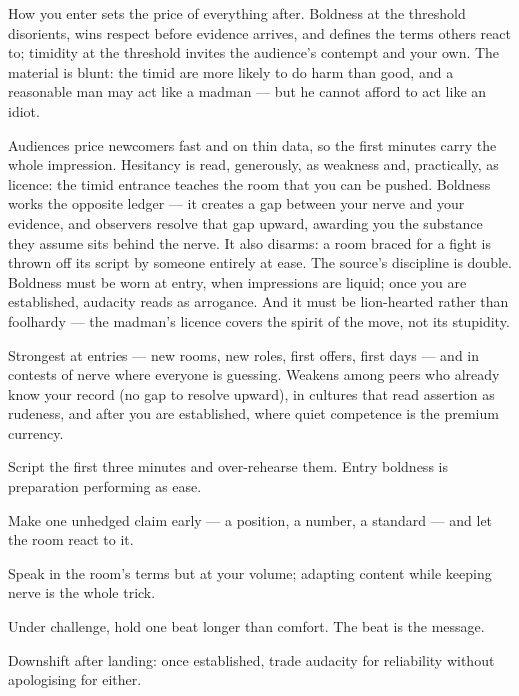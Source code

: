 \begin{core}
How you enter sets the price of everything after. Boldness at the threshold disorients, wins respect before evidence arrives, and defines the terms others react to; timidity at the threshold invites the audience's contempt and your own. The material is blunt: the timid are more likely to do harm than good, and a reasonable man may act like a madman --- but he cannot afford to act like an idiot.
\end{core}
\begin{mechanism}
Audiences price newcomers fast and on thin data, so the first minutes carry the whole impression. Hesitancy is read, generously, as weakness and, practically, as licence: the timid entrance teaches the room that you can be pushed. Boldness works the opposite ledger --- it creates a gap between your nerve and your evidence, and observers resolve that gap upward, awarding you the substance they assume sits behind the nerve. It also disarms: a room braced for a fight is thrown off its script by someone entirely at ease. The source's discipline is double. Boldness must be worn at entry, when impressions are liquid; once you are established, audacity reads as arrogance. And it must be lion-hearted rather than foolhardy --- the madman's licence covers the spirit of the move, not its stupidity.
\end{mechanism}
\begin{conditions}
Strongest at entries --- new rooms, new roles, first offers, first days --- and in contests of nerve where everyone is guessing. Weakens among peers who already know your record (no gap to resolve upward), in cultures that read assertion as rudeness, and after you are established, where quiet competence is the premium currency.
\end{conditions}
\begin{application}
  \item Script the first three minutes and over-rehearse them. Entry boldness is preparation performing as ease.
  \item Make one unhedged claim early --- a position, a number, a standard --- and let the room react to it.
  \item Speak in the room's terms but at your volume; adapting content while keeping nerve is the whole trick.
  \item Under challenge, hold one beat longer than comfort. The beat is the message.
  \item Downshift after landing: once established, trade audacity for reliability without apologising for either.
\end{application}
